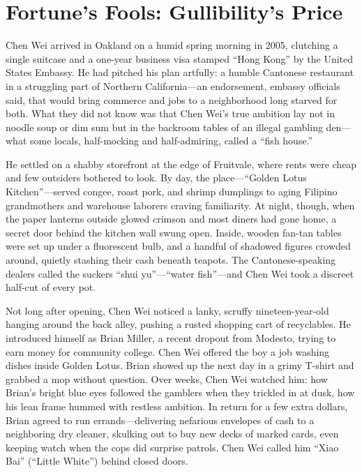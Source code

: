 \section{Fortune’s Fools: Gullibility’s Price}

Chen Wei arrived in Oakland on a humid spring morning in 2005, clutching a single suitcase and a one-year 
business visa stamped “Hong Kong” by the United States Embassy. He had pitched his plan artfully: a humble 
Cantonese restaurant in a struggling part of Northern California—an endorsement, embassy officials said, 
that would bring commerce and jobs to a neighborhood long starved for both. What they did not know was 
that Chen Wei’s true ambition lay not in noodle soup or dim sum but in the backroom tables of an illegal 
gambling den—what some locals, half-mocking and half-admiring, called a “fish house.”

He settled on a shabby storefront at the edge of Fruitvale, where rents were cheap and few outsiders 
bothered to look. By day, the place—“Golden Lotus Kitchen”—served congee, roast pork, and shrimp dumplings 
to aging Filipino grandmothers and warehouse laborers craving familiarity. At night, though, when the 
paper lanterns outside glowed crimson and most diners had gone home, a secret door behind the kitchen 
wall swung open. Inside, wooden fan-tan tables were set up under a fluorescent bulb, and a handful of 
shadowed figures crowded around, quietly stashing their cash beneath teapots. The Cantonese-speaking 
dealers called the suckers “shui yu”—“water fish”—and Chen Wei took a discreet half-cut of every pot.

Not long after opening, Chen Wei noticed a lanky, scruffy nineteen-year-old hanging around the back alley, 
pushing a rusted shopping cart of recyclables. He introduced himself as Brian Miller, a recent dropout 
from Modesto, trying to earn money for community college. Chen Wei offered the boy a job washing dishes 
inside Golden Lotus. Brian showed up the next day in a grimy T-shirt and grabbed a mop without question. 
Over weeks, Chen Wei watched him: how Brian’s bright blue eyes followed the gamblers when they trickled 
in at dusk, how his lean frame hummed with restless ambition. In return for a few extra dollars, Brian 
agreed to run errands—delivering nefarious envelopes of cash to a neighboring dry cleaner, skulking out 
to buy new decks of marked cards, even keeping watch when the cops did surprise patrols. Chen Wei called 
him “Xiao Bai” (“Little White”) behind closed doors.

